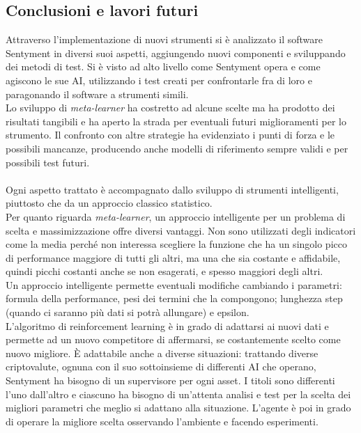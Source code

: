 \documentclass[a4paper,12pt]{report}
\begin{document}
\begin{fig}
\chapter{Conclusioni e lavori futuri}
\label{cap5}
Attraverso l'implementazione di nuovi strumenti si è analizzato il software Sentyment in diversi suoi aspetti, aggiungendo nuovi componenti e sviluppando dei metodi di test. Si è visto ad alto livello come Sentyment opera e come agiscono le sue AI, utilizzando i test creati per confrontarle fra di loro e paragonando il software a strumenti simili.\\Lo sviluppo di \textit{meta-learner} ha costretto ad alcune scelte ma ha prodotto dei risultati tangibili e ha aperto la strada per eventuali futuri miglioramenti per lo strumento. Il confronto con altre strategie ha evidenziato i punti di forza e le possibili mancanze, producendo anche modelli di riferimento sempre validi e per possibili test futuri.\\~\\
Ogni aspetto trattato è accompagnato dallo sviluppo di strumenti intelligenti, piuttosto che da un approccio classico statistico.\\ Per quanto riguarda \textit{meta-learner}, un approccio intelligente per un problema di scelta e massimizzazione offre diversi vantaggi. Non sono utilizzati degli indicatori come la media perché non interessa scegliere la funzione che ha un singolo picco di performance maggiore di tutti gli altri, ma una che sia costante e affidabile, quindi picchi costanti anche se non esagerati, e spesso maggiori degli altri.\\ Un approccio intelligente permette eventuali modifiche cambiando i parametri: formula della performance, pesi dei termini che la compongono; lunghezza step (quando ci saranno più dati si potrà allungare) e epsilon.\\ L'algoritmo di reinforcement learning è in grado di adattarsi ai nuovi dati e permette ad un nuovo competitore di affermarsi, se costantemente scelto come nuovo migliore. È adattabile anche a diverse situazioni: trattando diverse criptovalute, ognuna con il suo sottoinsieme di differenti AI che operano, Sentyment ha bisogno di un supervisore per ogni asset. I titoli sono differenti l'uno dall'altro e ciascuno ha bisogno di un'attenta analisi e test per la scelta dei migliori parametri che meglio si adattano alla situazione. L'agente è poi in grado di operare la migliore scelta osservando l'ambiente e facendo esperimenti.\\~\\

\end{fig}
\end{document}
